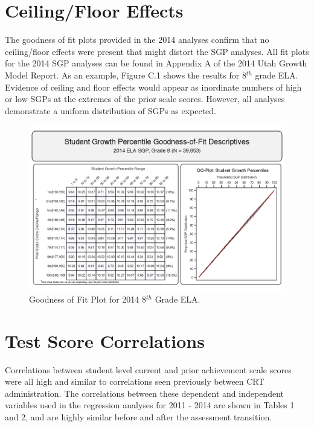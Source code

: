 \documentclass[12pt]{article}
\begin{document}
\pagebreak

\section{Ceiling/Floor Effects}\label{ceilingfloor-effects}

The goodness of fit plots provided in the 2014 analyses confirm that no
ceiling/floor effects were present that might distort the SGP analyses.
All fit plots for the 2014 SGP analyses can be found in Appendix A of
the 2014 Utah Growth Model Report. As an example, Figure C.1 shows the
results for 8\(^{th}\) grade ELA. Evidence of ceiling and floor effects
would appear as inordinate numbers of high or low SGPs at the extremes
of the prior scale scores. However, all analyses demonstrate a uniform
distribution of SGPs as expected.

\begin{figure}[htbp]
\centering
\includegraphics{../img/Goodness_of_Fit/ELA.2014/gofSGP_Grade_8.png}
\caption{Goodness of Fit Plot for 2014 8\(^{th}\) Grade ELA.}
\end{figure}

\pagebreak

\section{Test Score Correlations}\label{test-score-correlations}

Correlations between student level current and prior achievement scale
scores were all high and similar to correlations seen previously between
CRT administration. The correlations between these dependent and
independent variables used in the regression analyses for 2011 - 2014
are shown in Tables 1 and 2, and are highly similar before and after the
assessment transition.
\end{document}
